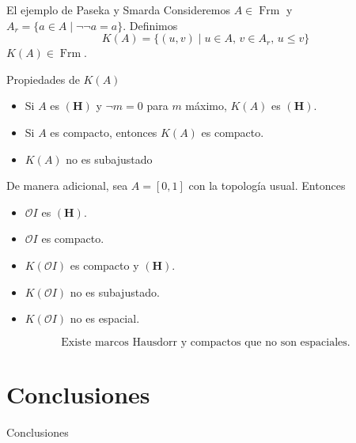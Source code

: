 \documentclass[compress,12pt]{beamer}
\DeclareMathOperator{\Frm}{Frm}
\begin{document}
\begin{frame}{El ejemplo de Paseka y Smarda}
Consideremos $A\in\Frm$ y $A_r=\{a\in A\mid \neg\neg a=a\}$. Definimos
\[
K(A)=\{(u,v)\mid u\in A,\, v\in A_r,\, u\leq v\}
\]
$K(A)\in \Frm$.
\begin{block}{Propiedades de $K(A)$}
\begin{itemize}
	\item Si $A$ es $\mathbf{(H)}$ y $\neg m=0$ para $m$ máximo, $K(A)$ es $\mathbf{(H)}$.
	\item Si $A$ es compacto, entonces $K(A)$ es compacto.
	\item $K(A)$ no es subajustado
\end{itemize}
\end{block}
\end{frame}

\begin{frame}
De manera adicional, sea $A=[0,1]$ con la topología usual. Entonces
\begin{itemize}
\item $\mathcal{O}I$ es $\mathbf{(H)}$.
\item $\mathcal{O}I$ es compacto.
\item $K(\mathcal{O}I)$ es compacto y $\mathbf{(H)}$.
\item $K(\mathcal{O}I)$ no es subajustado.
\item $K(\mathcal{O}I)$ no es espacial.
\end{itemize}

\[
\mbox{Existe marcos Hausdorr y compactos que no son espaciales}.
\]
\end{frame}

\section{Conclusiones}
\begin{frame}{Conclusiones}

\end{frame}


\End
\end{document}
